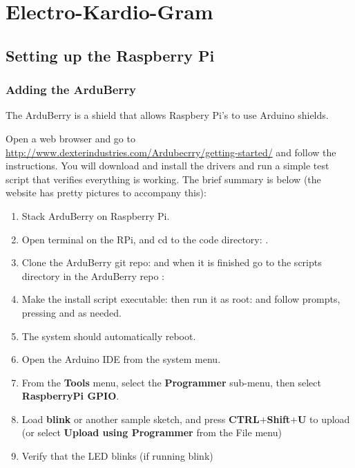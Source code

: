 \chapter{Electro-Kardio-Gram}


\section{Setting up the Raspberry Pi}

\subsection{Adding the ArduBerry}

The ArduBerry is a shield that allows Raspbery Pi's to use Arduino shields.

Open a web browser and go to \url{http://www.dexterindustries.com/Ardubecrry/getting-started/} and follow the instructions.  You will download and install the drivers and run a simple test script that verifies everything is working.  The brief summary is below (the website has pretty pictures to accompany this):

\begin{enumerate}
\item Stack ArduBerry on Raspberry Pi.
\item Open terminal on the RPi, and cd to the code directory: .
\item Clone the ArduBerry git repo:  and when it is finished go to the scripts directory in the ArduBerry repo :
\item Make the install script executable: then run it as root:  and follow prompts, pressing  and  as needed.
\item The system should automatically reboot.
\item Open the Arduino IDE from the system menu.
\item From the \textbf{Tools} menu, select the \textbf{Programmer} sub-menu, then select \textbf{RaspberryPi GPIO}.
\item Load \textbf{blink} or another sample sketch, and press \textbf{CTRL}$+$\textbf{Shift}$+$\textbf{U} to upload (or select \textbf{Upload using Programmer} from the File menu)
\item Verify that the LED blinks (if running blink)
\end{enumerate}


